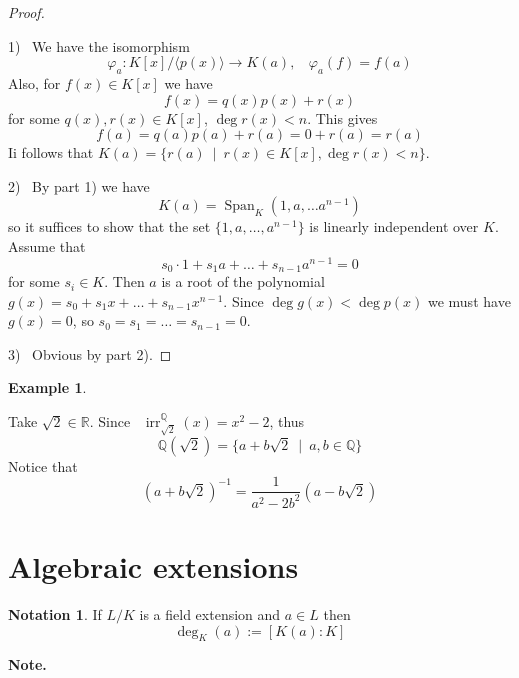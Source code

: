 \documentclass[12pt, letterpaper, oneside]{article}
\theoremstyle{plain}
\theoremstyle{definition}
\newtheorem{example}[theorem]{Example}
\newtheorem{notation}[theorem]{Notation}
\newcommand{\lra}{\longrightarrow}
\newcommand{\Q}{{\mathbb Q}}
\newcommand{\R}{{\mathbb R}}
\newcommand{\subgp}[1]{\langle#1\rangle}
\newcommand{\irr}{\operatorname{irr}}
\newcommand{\vs}{\vskip 5mm}
\begin{document}
\vs

\begin{proof}\ 

1) \  We have the isomorphism 
$$\varphi_{a}\colon K[x]/\subgp{p(x)} \lra K(a), \ \ \ \ \varphi_{a}(f) = f(a)$$
Also, for $f(x)\in K[x]$ we have 
$$f(x) = q(x)p(x) + r(x)$$
for some $q(x), r(x)\in K[x]$, $\deg r(x) < n$. 
This gives 
$$f(a) = q(a)p(a) +r(a) = 0 + r(a) = r(a)$$
Ii follows that $K(a) = \{ r(a) \ \mid \ r(x)\in K[x], \deg r(x) < n \}$.


\vs 


2) \ By part 1) we have 
$$K(a) = \operatorname{Span}_{K}(1, a, \dots a^{n-1})$$
so it suffices to show that the set $\{ 1, a, \dots, a^{n-1}\}$ is linearly 
independent over $K$. Assume that 
$$s_{0}\cdot 1 + s_{1}a + {\dots} + s_{n-1}a^{n-1} = 0$$
for some $s_{i}\in K$. Then $a$ is a root of the polynomial 
$g(x)= s_{0} + s_{1}x + {\dots} + s_{n-1}x^{n-1}$. Since 
$\deg g(x) < \deg p(x)$ we must have $g(x)  = 0$, so $s_{0} = s_{1} = {\dots} = s_{n-1} = 0$. 


\vs

3) \ Obvious by part 2).


\end{proof}


\vs\vs

\begin{example}\ 


Take $\sqrt{2} \in \R$. Since  \ $\irr^{\Q}_{\sqrt{2}}(x) = x^{2}-2$, thus
$$\Q(\sqrt{2}) = \{a + b\sqrt{2} \ \mid \ a, b\in \Q \}$$
Notice that 
$$(a+b\sqrt{2})^{-1} = \frac{1}{a^{2}-2b^{2}}(a-b\sqrt{2})$$
\end{example}





\newpage
\section{Algebraic extensions}
\label{SEC_ALGEXT}




\begin{notation}
If $L/K$ is a field extension and $a\in L$ then 
$$\deg_{K}(a) := [K(a) : K]$$ 
\end{notation}



\textbf{Note.} \ 
\end{document}

